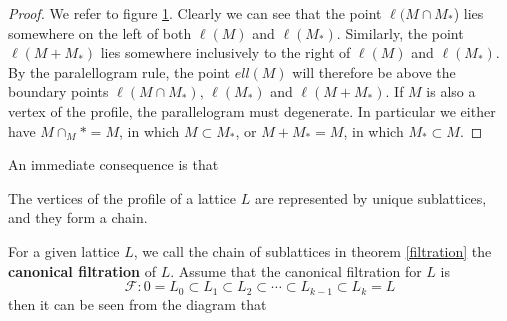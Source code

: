 \begin{figure}[H]
    \centering
    \caption{}
    \label{figure33}
\end{figure}
\begin{proof}
    We refer to figure \ref{figure33}. Clearly we can see that the point $\ell(M\cap M_*$) lies somewhere on the left of both
    $\ell(M)$ and $\ell(M_*)$. Similarly, the point $\ell(M+M_*)$ lies somewhere inclusively to the right of $\ell(M)$ and $\ell(M_*)$.
        By the paralellogram rule, the point $ell(M)$ will therefore be above the boundary points
    $\ell(M\cap M_*)$, $\ell(M_*)$ and $\ell(M+M_*)$. If $M$ is also a vertex of the profile, the parallelogram must degenerate. In particular we either have
    $M \cap _M*=M$, in which $M\subset M_*$, or $M+M_* = M$, in which $M_* \subset M$.
\end{proof}
An immediate consequence is that
\begin{theorem}\label{filtration}
    The vertices of the profile of a lattice $L$ are represented by unique sublattices, and they form a chain.
\end{theorem}
For a given lattice $L$, we call the chain of sublattices in theorem \ref{filtration} the \textbf{canonical filtration} of $L$. Assume that the canonical filtration for $L$
is
\[\mathcal{F}: 0 = L_0 \subset L_1 \subset L_2 \subset \cdots \subset L_{k-1} \subset L_k = L \]
then it can be seen from the diagram that

